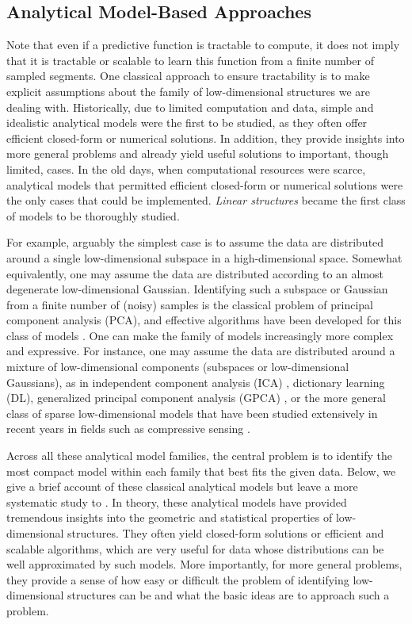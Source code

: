 \documentclass[../../book-main.tex]{subfiles}
\begin{document}
\subsection{Analytical Model-Based  Approaches}
\label{sec:analytical}
Note that even if a predictive function is tractable to compute, it
does not imply that it is tractable or scalable to learn this
function from a finite number of sampled segments. One classical
approach to ensure tractability is to make explicit assumptions about
the family of low-dimensional structures we are dealing with.
Historically, due to limited computation and data, simple and
idealistic analytical models were the first to be studied, as they
often offer efficient closed-form or numerical solutions. In
addition, they provide insights into more general problems and
already yield useful solutions to important, though limited, cases.
In the old days, when computational resources were scarce, analytical
models that permitted efficient closed-form or numerical solutions
were the only cases that could be implemented. \textit{Linear
structures} became the first class of models to be thoroughly studied.

For example, arguably the simplest case is to assume the data are
distributed around a single low-dimensional subspace in a
high-dimensional space. Somewhat equivalently, one may assume the
data are distributed according to an almost degenerate
low-dimensional Gaussian. Identifying such a subspace or Gaussian
from a finite number of (noisy) samples is the classical problem of
principal component analysis (PCA), and effective algorithms have
been developed for this class of models \cite{JolliffeI2002}. One can
make the family of models increasingly more complex and expressive.
For instance, one may assume the data are distributed around a
mixture of low-dimensional components (subspaces or low-dimensional
Gaussians), as in independent component analysis (ICA)
\cite{Ans-1985}, dictionary learning (DL), generalized principal
component analysis (GPCA) \cite{Vidal-GPCA}, or the more general
class of sparse low-dimensional models that have been studied
extensively in recent years in fields such as compressive sensing
\cite{Wright-Ma-2022}.

Across all these analytical model families, the central problem is to
identify the most compact model within each family that best fits the
given data. Below, we give a brief account of these classical
analytical models but leave a more systematic study to
. In theory, these analytical models have provided
tremendous insights into the geometric and statistical properties of
low-dimensional structures. They often yield closed-form solutions or
efficient and scalable algorithms, which are very useful for data
whose distributions can be well approximated by such models. More
importantly, for more general problems, they provide a sense of how
easy or difficult the problem of identifying low-dimensional
structures can be and what the basic ideas are to approach such a problem.
\end{document}

